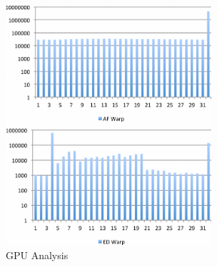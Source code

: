 \begin{figure}[h] \centering
\vspace{0.1in}
\includegraphics[width=3in]{./figure/Warp2_B.pdf} \vspace{0in}
\caption{GPU Analysis}
\label{fig:warp} \end{figure}
